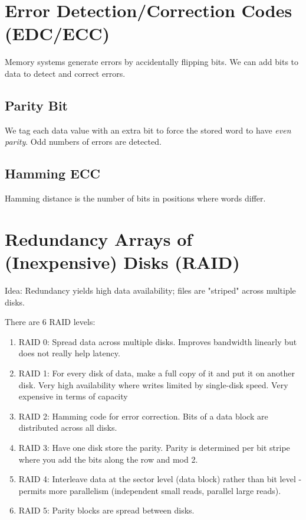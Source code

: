 \section{Error Detection/Correction Codes (EDC/ECC)}
Memory systems generate errors by accidentally flipping bits. We can add bits to data to detect and correct errors.

\subsection{Parity Bit}
We tag each data value with an extra bit to force the stored word to have \emph{even parity}. Odd numbers of errors are detected.

\subsection{Hamming ECC}
Hamming distance is the number of bits in positions where words differ.

\section{Redundancy Arrays of (Inexpensive) Disks (RAID)}
Idea: Redundancy yields high data availability; files are "striped" across multiple disks.

There are 6 RAID levels:
\begin{enumerate}
    \item RAID 0: Spread data across multiple disks. Improves bandwidth linearly but does not really help latency.
    \item RAID 1: For every disk of data, make a full copy of it and put it on another disk. Very high availability where writes limited by single-disk speed. Very expensive in terms of capacity
    \item RAID 2: Hamming code for error correction. Bits of a data block are distributed across all disks.
    \item RAID 3: Have one disk store the parity. Parity is determined per bit stripe where you add the bits along the row and mod 2.
    \item RAID 4: Interleave data at the sector level (data block) rather than bit level - permits more parallelism (independent small reads, parallel large reads).
    \item RAID 5: Parity blocks are spread between disks.
\end{enumerate}
